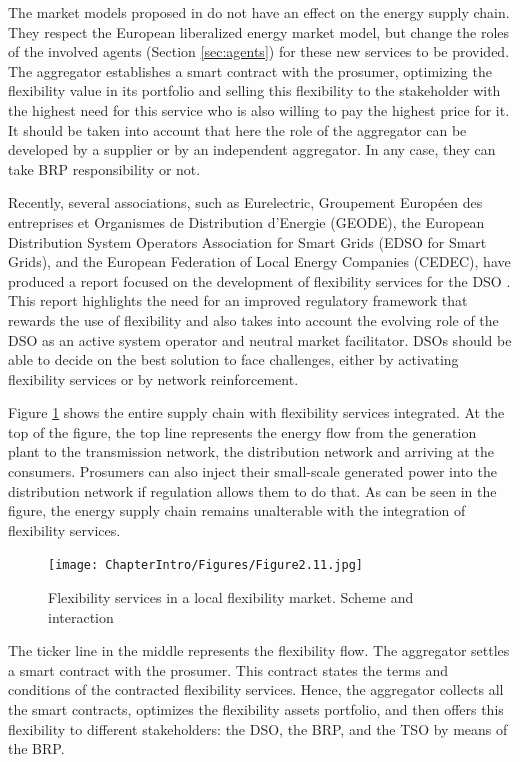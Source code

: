 The market models proposed in \cite{USEFFoundation2015a, MarketDesignENTSOE} do not have an effect on the energy supply chain. They respect the European liberalized energy market model, but change the roles of the involved agents (Section \ref{sec:agents}) for these new services to be provided. The aggregator establishes a smart contract with the prosumer, optimizing the flexibility value in its portfolio and selling this flexibility to the stakeholder with the highest need for this service who is also willing to pay the highest price for it. It should be taken into account that here the role of the aggregator can be developed by a supplier or by an independent aggregator. In any case, they can take BRP responsibility or not.

Recently, several associations, such as Eurelectric, Groupement Europ\'{e}en des entreprises et Organismes de Distribution d'Energie (GEODE), the European Distribution System Operators Association for Smart Grids (EDSO for Smart Grids), and the European Federation of Local Energy Companies (CEDEC), have produced a report focused on the development of flexibility services for the DSO \cite{edso2018flexibility}. This report highlights the need for an improved regulatory framework that rewards the use of flexibility and also takes into account the evolving role of the DSO as an active system operator and neutral market facilitator. DSOs should be able to decide on the best solution to face challenges, either by activating flexibility services or by network reinforcement.

Figure \ref{fig:211} shows the entire supply chain with flexibility services integrated. At the top of the figure, the top line represents the energy flow from the generation plant to the transmission network, the distribution network and arriving at the consumers. Prosumers can also inject their small-scale generated power into the distribution network if regulation allows them to do that. As can be seen in the figure, the energy supply chain remains unalterable with the integration of flexibility services.

\begin{figure}[h]
	\centering
	\texttt{[image: ChapterIntro/Figures/Figure2.11.jpg]}
		\caption{Flexibility services in a local flexibility market. Scheme and interaction}  
	\label{fig:211}
\end{figure}

The ticker line in the middle represents the flexibility flow. The aggregator settles a smart contract with the prosumer. This contract states the terms and conditions of the contracted flexibility services. Hence, the aggregator collects all the smart contracts, optimizes the flexibility assets portfolio, and then offers this flexibility to different stakeholders: the DSO, the BRP, and the TSO by means of the BRP. 

